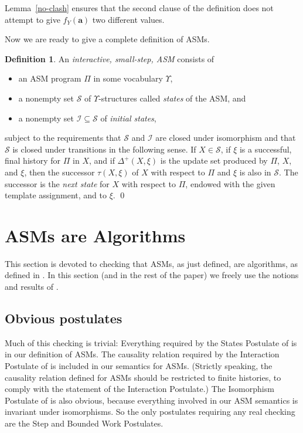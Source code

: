 \documentclass{LMCS}
\theoremstyle{definition}
\newtheorem{df}[thm]{Definition}
\newenvironment{ls}{\begin{itemize}}{\end{itemize}}
\newcommand{\DD}{\Delta^+}
\newcommand{\U}{\Upsilon}
\newcommand{\bld}[1]{\ensuremath{\mathbf {#1}}}
\newcommand{\scr}[1]{\ensuremath{\mathcal {#1}}}
\begin{document}
Lemma~\ref{no-clash} ensures that the second clause of
the definition does not attempt to give $f_Y(\bld a)$ two different
values. 

Now we are ready to give a complete definition of ASMs.

\begin{df}   \label{asm-def}
  An \emph{interactive, small-step, ASM} consists of
  \begin{ls}
    \item an ASM program $\Pi$ in some vocabulary $\U$,
    \item a nonempty set $\scr S$ of $\U$-structures called \emph{states}
    of the ASM, and
    \item a nonempty set $\scr I\subseteq \scr S$ of \emph{initial states},
  \end{ls}
subject to the requirements that \scr S and \scr I are closed under
isomorphism and that \scr S is closed under transitions in the following
sense.  If $X\in\scr S$, if $\xi$ is a successful, final history for $\Pi$
in $X$, and if $\DD(X,\xi)$ is the update set produced by $\Pi$, $X$, and
$\xi$, then the successor $\tau(X,\xi)$ of $X$ with respect to $\Pi$ and
$\xi$ is also in \scr S.  The successor is the \emph{next state} for $X$
with respect to $\Pi$, endowed with the given template assignment, and to
$\xi$.  \qed
\end{df}

\section{ASMs are Algorithms} \label{sec:asms-are-algos}

This section is devoted to checking that ASMs, as just defined, are
algorithms, as defined in \cite{ga1}. In this section (and in the
rest of the paper) we freely use the notions and results of
\cite{ga1}.

\subsection{Obvious postulates}

Much of this checking is trivial: Everything required by the States
Postulate of \cite{ga1} is in our definition of ASMs.  The causality
relation required by the Interaction Postulate of \cite{ga1} is
included in our semantics for ASMs. (Strictly speaking, the
causality relation defined for ASMs should be restricted to finite
histories, to comply with the statement of the Interaction
Postulate.)  The Isomorphism Postulate of \cite{ga1} is also
obvious, because everything involved in our ASM semantics is
invariant under isomorphisms.  So the only postulates requiring any
real checking are the Step and Bounded Work Postulates.
\end{document}
